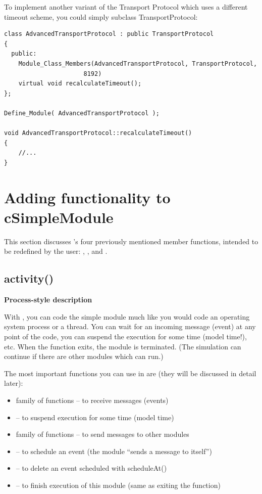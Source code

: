 To implement another variant of the Transport Protocol which uses a
different timeout scheme, you could simply subclass TransportProtocol:

\begin{verbatim}
class AdvancedTransportProtocol : public TransportProtocol
{
  public:
    Module_Class_Members(AdvancedTransportProtocol, TransportProtocol,
                      8192)
    virtual void recalculateTimeout();
};

Define_Module( AdvancedTransportProtocol );

void AdvancedTransportProtocol::recalculateTimeout()
{
    //...
}
\end{verbatim}




\section{Adding functionality to cSimpleModule}

This section discusses 's four previously
mentioned member functions, intended to be redefined by the user:
, ,  and
.


\subsection{activity()}

\textbf{Process-style description}

With , you can code the simple
module much like you would code an operating system process or a
thread. You can wait for an incoming message (event) at any point of
the code, you can suspend the execution for some time (model time!),
etc. When the  function exits, the module is
terminated.  (The simulation can continue if there are other modules
which can run.)


The most important functions you can use in  are
(they will be discussed in detail later):
\begin{itemize}
\item{ family of functions -- to receive messages (events)}
\item{ -- to suspend execution
    for some time (model time)}
\item{ family of functions -- to send messages to other
    modules}
\item{ -- to schedule an event (the module ``sends
    a message to itself'')}
\item{ -- to delete an event scheduled with
    scheduleAt()}
\item{ -- to finish execution of this module (same as
    exiting the  function)}
\end{itemize}

